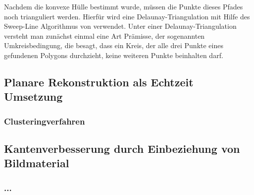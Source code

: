 Nachdem die konvexe Hülle bestimmt wurde, müssen die Punkte dieses Pfades noch trianguliert werden. Hierfür wird eine Delaunay-Triangulation mit Hilfe des Sweep-Line Algorithmus von \citet{domiter2008sweep} verwendet. Unter einer Delaunay-Triangulation versteht man zunächst einmal eine Art Prämisse, der sogenannten Umkreisbedingung, die besagt, dass ein Kreis, der alle drei Punkte eines gefundenen Polygons durchzieht, keine weiteren Punkte beinhalten darf.

\subsection{Planare Rekonstruktion als Echtzeit Umsetzung}

\subsubsection{Clusteringverfahren}

\subsection{Kantenverbesserung durch Einbeziehung von Bildmaterial}

\subsubsection{...}